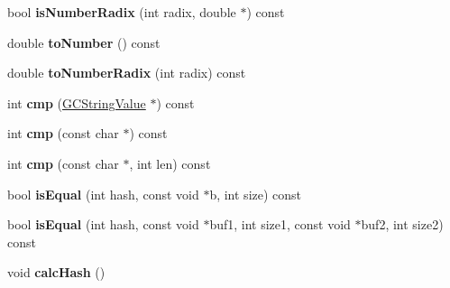 \begin{DoxyCompactItemize}
\item 
bool {\bfseries is\+Number\+Radix} (int radix, double $\ast$) const \hypertarget{struct_object_script_1_1_o_s_1_1_core_1_1_g_c_string_value_ad34dec5f97a5db3f7a35176686ee0dac}{}\label{struct_object_script_1_1_o_s_1_1_core_1_1_g_c_string_value_ad34dec5f97a5db3f7a35176686ee0dac}

\item 
double {\bfseries to\+Number} () const \hypertarget{struct_object_script_1_1_o_s_1_1_core_1_1_g_c_string_value_afaa747bf3d8d99601fb0f55e0baef3c2}{}\label{struct_object_script_1_1_o_s_1_1_core_1_1_g_c_string_value_afaa747bf3d8d99601fb0f55e0baef3c2}

\item 
double {\bfseries to\+Number\+Radix} (int radix) const \hypertarget{struct_object_script_1_1_o_s_1_1_core_1_1_g_c_string_value_a74ab7af4e486b50b7771b23aaa404bdd}{}\label{struct_object_script_1_1_o_s_1_1_core_1_1_g_c_string_value_a74ab7af4e486b50b7771b23aaa404bdd}

\item 
int {\bfseries cmp} (\hyperlink{struct_object_script_1_1_o_s_1_1_core_1_1_g_c_string_value}{G\+C\+String\+Value} $\ast$) const \hypertarget{struct_object_script_1_1_o_s_1_1_core_1_1_g_c_string_value_ab9c884e5e2088bdb09df193b074c63f7}{}\label{struct_object_script_1_1_o_s_1_1_core_1_1_g_c_string_value_ab9c884e5e2088bdb09df193b074c63f7}

\item 
int {\bfseries cmp} (const char $\ast$) const \hypertarget{struct_object_script_1_1_o_s_1_1_core_1_1_g_c_string_value_ae5327b528aacf60eaf3022d3e514da6b}{}\label{struct_object_script_1_1_o_s_1_1_core_1_1_g_c_string_value_ae5327b528aacf60eaf3022d3e514da6b}

\item 
int {\bfseries cmp} (const char $\ast$, int len) const \hypertarget{struct_object_script_1_1_o_s_1_1_core_1_1_g_c_string_value_a3ca5a166c4ae3e91a8242ee15f5155a1}{}\label{struct_object_script_1_1_o_s_1_1_core_1_1_g_c_string_value_a3ca5a166c4ae3e91a8242ee15f5155a1}

\item 
bool {\bfseries is\+Equal} (int hash, const void $\ast$b, int size) const \hypertarget{struct_object_script_1_1_o_s_1_1_core_1_1_g_c_string_value_abee4147b7978f69480079547b9f06cf1}{}\label{struct_object_script_1_1_o_s_1_1_core_1_1_g_c_string_value_abee4147b7978f69480079547b9f06cf1}

\item 
bool {\bfseries is\+Equal} (int hash, const void $\ast$buf1, int size1, const void $\ast$buf2, int size2) const \hypertarget{struct_object_script_1_1_o_s_1_1_core_1_1_g_c_string_value_afadd88d07e803dc4ba82d9a66111f4ef}{}\label{struct_object_script_1_1_o_s_1_1_core_1_1_g_c_string_value_afadd88d07e803dc4ba82d9a66111f4ef}

\item 
void {\bfseries calc\+Hash} ()\hypertarget{struct_object_script_1_1_o_s_1_1_core_1_1_g_c_string_value_aaa507ef3fa0d392e6412ef96aa6e32d6}{}\label{struct_object_script_1_1_o_s_1_1_core_1_1_g_c_string_value_aaa507ef3fa0d392e6412ef96aa6e32d6}

\end{DoxyCompactItemize}
